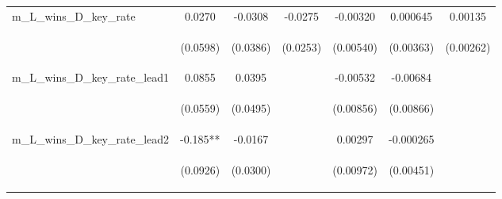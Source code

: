\documentclass[]{article}
\begin{document}
\begin{center}
\begin{tabular}{lcccccc}
m\_L\_wins\_D\_key\_rate & 0.0270 & -0.0308 & -0.0275 & -0.00320 & 0.000645 & 0.00135 \\
\vspace{4pt} & \begin{footnotesize}(0.0598)\end{footnotesize} & \begin{footnotesize}(0.0386)\end{footnotesize} & \begin{footnotesize}(0.0253)\end{footnotesize} & \begin{footnotesize}(0.00540)\end{footnotesize} & \begin{footnotesize}(0.00363)\end{footnotesize} & \begin{footnotesize}(0.00262)\end{footnotesize} \\
m\_L\_wins\_D\_key\_rate\_lead1 & 0.0855 & 0.0395 &  & -0.00532 & -0.00684 &  \\
\vspace{4pt} & \begin{footnotesize}(0.0559)\end{footnotesize} & \begin{footnotesize}(0.0495)\end{footnotesize} & \begin{footnotesize}\end{footnotesize} & \begin{footnotesize}(0.00856)\end{footnotesize} & \begin{footnotesize}(0.00866)\end{footnotesize} & \begin{footnotesize}\end{footnotesize} \\
m\_L\_wins\_D\_key\_rate\_lead2 & -0.185** & -0.0167 &  & 0.00297 & -0.000265 &  \\
\vspace{4pt} & \begin{footnotesize}(0.0926)\end{footnotesize} & \begin{footnotesize}(0.0300)\end{footnotesize} & \begin{footnotesize}\end{footnotesize} & \begin{footnotesize}(0.00972)\end{footnotesize} & \begin{footnotesize}(0.00451)\end{footnotesize} & \begin{footnotesize}\end{footnotesize} \\

\end{tabular}
\end{center}
\end{document}
